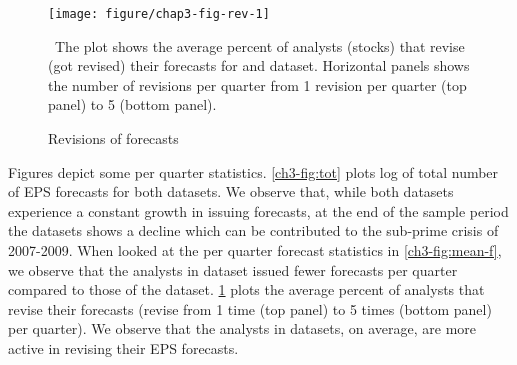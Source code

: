 \documentclass[12pt,a4paper]{article}\usepackage[]{graphicx}\usepackage[]{color}
\makeatletter
\def\maxwidth{ %
  \ifdim\Gin@nat@width>\linewidth
    \linewidth
  \else
    \Gin@nat@width
  \fi
}
\newenvironment{knitrout}{}{} %
\makeatother
\begin{document}
%
%
%

\begin{figure}
\begin{knitrout}
\color{fgcolor}
\texttt{[image: figure/chap3-fig-rev-1]} 

\end{knitrout}
\caption{Revisions of forecasts}
\ The plot shows the average percent of analysts (stocks) that revise (got revised) their forecasts for \sample{} and \filtered{} dataset. Horizontal panels shows the number of revisions per quarter from 1 revision per quarter (top panel) to 5 (bottom panel).
\label{ch3-fig:rev}
\end{figure}

Figures  depict some per quarter statistics. \ref{ch3-fig:tot} plots log of total number of EPS forecasts for both datasets. We observe that, while both datasets experience a constant growth in issuing forecasts, at the end of the sample period the \filtered{} datasets shows a decline which can be contributed to the sub-prime crisis of 2007-2009. When looked at the per quarter forecast statistics in \ref{ch3-fig:mean-f}, we observe that the analysts in \filtered{} dataset issued fewer forecasts per quarter compared to those of the \sample{} dataset. \ref{ch3-fig:rev} plots the average percent of analysts that revise their forecasts (revise from 1 time (top panel) to 5 times (bottom panel) per quarter). We observe that the analysts in \filtered{} datasets, on average, are more active in revising their EPS forecasts.
\end{document}
